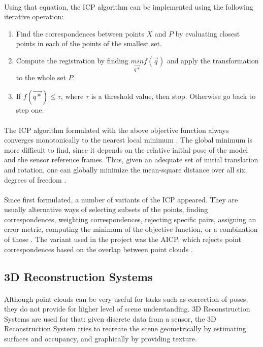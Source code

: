 \documentclass[11pt]{article}
\begin{document}
	\paragraph{}
	Using that equation, the ICP algorithm can be implemented using the following iterative operation:
	\begin{enumerate}[leftmargin=.8in]
		\item Find the correspondences between points $X$ and $P$ by evaluating closest points in each of the points of the smallest set.
		\item Compute the registration by finding $\underset{\overrightarrow{q*}}{min}f(\overrightarrow{q})$ and apply the transformation to the whole set $P$.
		\item If $f(\overrightarrow{q*}) \leq \tau$, where $\tau$ is a threshold value, then stop. Otherwise go back to step one.
	\end{enumerate}	
	
	\paragraph{}
	The ICP algorithm formulated with the above objective function always converges monotonically to the nearest local minimum \cite{AMethodRegistration}. The global minimum is more difficult to find, since it depends on the relative initial pose of the model and the sensor reference frames. Thus, given an adequate set of initial translation and rotation, one can globally minimize the mean-square distance over all six degrees of freedom \cite{AMethodRegistration}.

	\paragraph{}
	Since first formulated, a number of variants of the ICP appeared. They are usually alternative ways of selecting subsets of the points, finding correspondences, weighting correspondences, rejecting specific pairs, assigning an error metric, computing the minimum of the objective function, or a combination of those \cite{ICPVariants}. The variant used in the project was the AICP, which rejects point correspondences based on the overlap between point clouds \cite{7989547}.
	
	\subsection{3D Reconstruction Systems}
	\paragraph{}
	Although point clouds can be very useful for tasks such as correction of poses, they do not provide for higher level of scene understanding. 3D Reconstruction Systems are used for that: given discrete data from a sensor, the 3D Reconstruction System tries to recreate the scene geometrically by estimating surfaces and occupancy, and graphically by providing texture.
	
\end{document}
